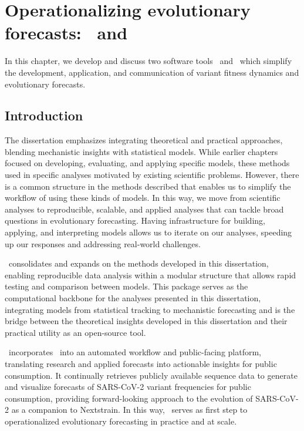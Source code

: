 \graphicspath{{./chapters/operationalizing-forecasts/}}
\chapter{Operationalizing evolutionary forecasts: \evofr\ and \forecastsNcov}

In this chapter, we develop and discuss two software tools \evofr\ and \forecastsNcov\ which simplify the development, application, and communication of variant fitness dynamics and evolutionary forecasts.

\section{Introduction}

The dissertation emphasizes integrating theoretical and practical approaches, blending mechanistic insights with statistical models.
While earlier chapters focused on developing, evaluating, and applying specific models, these methods used in specific analyses motivated by existing scientific problems.
However, there is a common structure in the methods described that enables us to simplify the workflow of using these kinds of models.
In this way, we move from scientific analyses to reproducible, scalable, and applied analyses that can tackle broad questions in evolutionary forecasting. %
Having infrastructure for building, applying, and interpreting models allows us to iterate on our analyses, speeding up our responses and addressing real-world challenges.



\evofr\ consolidates and expands on the methods developed in this dissertation, enabling reproducible data analysis within a modular structure that allows rapid testing and comparison between models. %
This package serves as the computational backbone for the analyses presented in this dissertation, integrating models from statistical tracking to mechanistic forecasting and is the bridge between the theoretical insights developed in this dissertation and their practical utility as an open-source tool. 

\forecastsNcov\ incorporates \evofr\ into an automated workflow and public-facing platform, translating research and applied forecasts into actionable insights for public consumption.
It continually retrieves publicly available sequence data to generate and visualize forecasts of SARS-CoV-2 variant frequencies for public consumption, providing forward-looking approach to the evolution of SARS-CoV-2 as a companion to Nextstrain. \cite{Hadfield2018}
In this way, \forecastsNcov\ serves as first step to operationalized evolutionary forecasting in practice and at scale.

